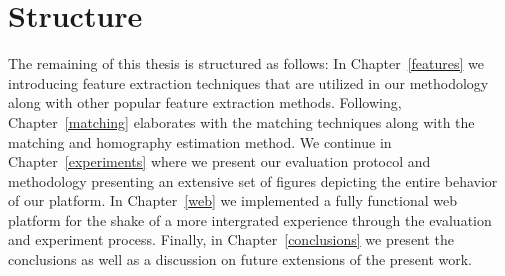 \section{Structure}
The remaining of this thesis is structured as follows:
In Chapter~\ref{features} we introducing feature extraction techniques that are utilized in our methodology along with other popular feature extraction methods. Following, Chapter~\ref{matching}  elaborates with the matching techniques along with the matching and homography estimation method. We continue in Chapter~\ref{experiments} where we present our evaluation protocol and methodology presenting an extensive set of figures depicting
the entire behavior of our platform. In Chapter~\ref{web} we implemented a fully functional web platform for the shake of a more intergrated experience through the evaluation and experiment process.
Finally, in Chapter~\ref{conclusions} we present the conclusions as well as a discussion on future extensions of the present work.